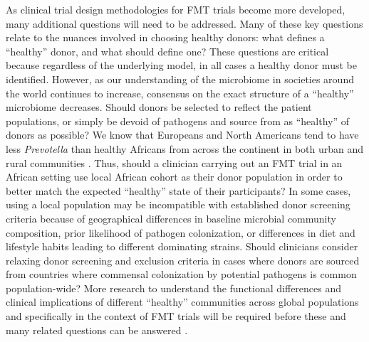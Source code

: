 As clinical trial design methodologies for FMT trials become more developed, many additional questions will need to be addressed.
Many of these key questions relate to the nuances involved in choosing healthy donors: what defines a ``healthy'' donor, and what should define one?
These questions are critical because regardless of the underlying model, in all cases a healthy donor must be identified.
However, as our understanding of the microbiome in societies around the world continues to increase, consensus on the exact structure of a ``healthy'' microbiome decreases.
Should donors be selected to reflect the patient populations, or simply be devoid of pathogens and source from as ``healthy'' of donors as possible?
We know that Europeans and North Americans tend to have less \textit{Prevotella} than healthy Africans from across the continent in both urban and rural communities \cite{Yatsunenko2012,Ou2013,DeFilippo2010}.
Thus, should a clinician carrying out an FMT trial in an African setting use local African cohort as their donor population in order to better match the expected ``healthy'' state of their participants?
In some cases, using a local population may be incompatible with established donor screening criteria because of geographical differences in baseline microbial community composition, prior likelihood of pathogen colonization, or differences in diet and lifestyle habits leading to different dominating strains.
Should clinicians consider relaxing donor screening and exclusion criteria in cases where donors are sourced from countries where commensal colonization by potential pathogens is common population-wide?
More research to understand the functional differences and clinical implications of different ``healthy'' communities across global populations and specifically in the context of FMT trials will be required before these and many related questions can be answered \cite{Bello2018,Rabesandratana2018}.

